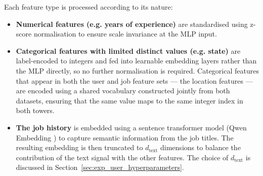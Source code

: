 Each feature type is processed according to its nature:
\begin{itemize}
    \item \textbf{Numerical features (e.g. years of experience)} are standardised using z-score normalisation to ensure scale invariance at the \gls{MLP} input.
    \item \textbf{Categorical features with limited distinct values (e.g. state)} are label-encoded to integers and fed into learnable embedding layers rather than the \gls{MLP} directly, so no further normalisation is required. Categorical features that appear in both the user and job feature sets --- the location features --- are encoded using a shared vocabulary constructed jointly from both datasets, ensuring that the same value maps to the same integer index in both towers.
    \item \textbf{The job history} is embedded using a sentence transformer model (Qwen Embedding \cite{yang2025qwen3technicalreport}) to capture semantic information from the job titles. The resulting embedding is then truncated to $d_{\text{text}}$ dimensions to balance the contribution of the text signal with the other features. The choice of $d_{\text{text}}$ is discussed in Section~\ref{sec:exp_user_hyperparameters}.
\end{itemize}


